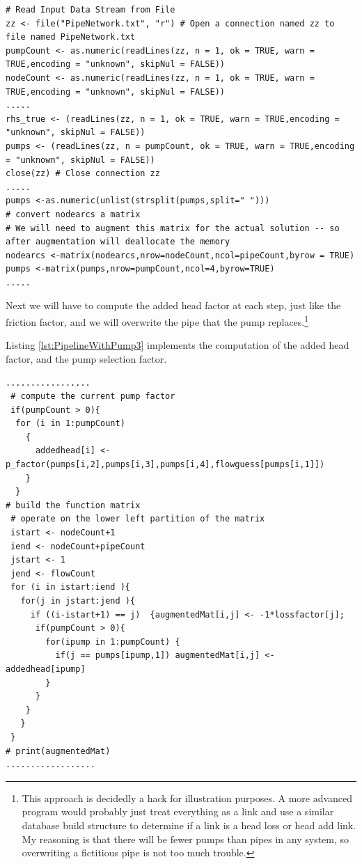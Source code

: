 \begin{lstlisting}[caption=R Code to include pumps in a pipeline network \\ , label=lst:PipelineWithPump2]
# Read Input Data Stream from File
zz <- file("PipeNetwork.txt", "r") # Open a connection named zz to file named PipeNetwork.txt
pumpCount <- as.numeric(readLines(zz, n = 1, ok = TRUE, warn = TRUE,encoding = "unknown", skipNul = FALSE))
nodeCount <- as.numeric(readLines(zz, n = 1, ok = TRUE, warn = TRUE,encoding = "unknown", skipNul = FALSE))
.....
rhs_true <- (readLines(zz, n = 1, ok = TRUE, warn = TRUE,encoding = "unknown", skipNul = FALSE))
pumps <- (readLines(zz, n = pumpCount, ok = TRUE, warn = TRUE,encoding = "unknown", skipNul = FALSE))
close(zz) # Close connection zz
.....
pumps <-as.numeric(unlist(strsplit(pumps,split=" ")))
# convert nodearcs a matrix
# We will need to augment this matrix for the actual solution -- so after augmentation will deallocate the memory
nodearcs <-matrix(nodearcs,nrow=nodeCount,ncol=pipeCount,byrow = TRUE)
pumps <-matrix(pumps,nrow=pumpCount,ncol=4,byrow=TRUE)
.....
\end{lstlisting}   

Next we will have to compute the added head factor at each step, just like the friction factor, and we will overwrite the pipe that the pump replaces.\footnote{This approach is decidedly a hack for illustration purposes.  A more advanced program would probably just treat everything as a link and use a similar database build structure to determine if a link is a head loss or head add link.  My reasoning is that there will be fewer pumps than pipes in any system, so overwriting a fictitious pipe is not too much trouble.}

Listing \ref{lst:PipelineWithPump3} implements the computation of the added head factor, and the pump selection factor.  

\begin{lstlisting}[caption=R Code to include pumps in a pipeline network \\ , label=lst:PipelineWithPump3]
.................
 # compute the current pump factor
 if(pumpCount > 0){
  for (i in 1:pumpCount)
    {
      addedhead[i] <- p_factor(pumps[i,2],pumps[i,3],pumps[i,4],flowguess[pumps[i,1]]) 
    }
  }
# build the function matrix
 # operate on the lower left partition of the matrix
 istart <- nodeCount+1
 iend <- nodeCount+pipeCount
 jstart <- 1
 jend <- flowCount
 for (i in istart:iend ){
   for(j in jstart:jend ){
     if ((i-istart+1) == j)  {augmentedMat[i,j] <- -1*lossfactor[j];
      if(pumpCount > 0){
        for(ipump in 1:pumpCount) {
          if(j == pumps[ipump,1]) augmentedMat[i,j] <- addedhead[ipump]
        }
      }
    }
   }
 }
# print(augmentedMat)
..................
\end{lstlisting}   

